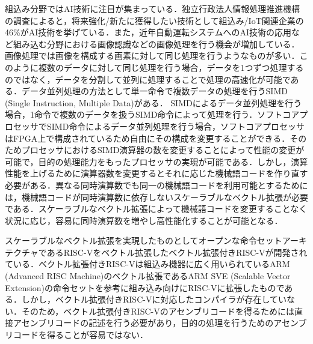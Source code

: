 組込み分野ではAI技術に注目が集まっている．独立行政法人情報処理推進機構の調査によると，将来強化/新たに獲得したい技術として組込み/IoT関連企業の46\%がAI技術を挙げている\cite{bib:ipa}．また，近年自動運転システムへのAI技術の応用など組み込む分野における画像認識などの画像処理を行う機会が増加している．
画像処理では画像を構成する画素に対して同じ処理を行うようなものが多い．このように複数のデータに対して同じ処理を行う場合，データを1つずつ処理するのではなく，データを分割して並列に処理することで処理の高速化が可能である．データ並列処理の方法として単一命令で複数データの処理を行うSIMD (Single Instruction, Multiple Data)がある\cite{bib:simd_mimd}．
SIMDによるデータ並列処理を行う場合，1命令で複数のデータを扱うSIMD命令によって処理を行う．ソフトコアプロセッサでSIMD命令によるデータ並列処理を行う場合，ソフトコアプロセッサはFPGA上で構成されているため自由にその構成を変更することができる．そのためプロセッサにおけるSIMD演算器の数を変更することによって性能の変更が可能で，目的の処理能力をもったプロセッサの実現が可能である．しかし，演算性能を上げるために演算器数を変更するとそれに応じた機械語コードを作り直す必要がある．異なる同時演算数でも同一の機械語コードを利用可能とするためには，機械語コードが同時演算数に依存しないスケーラブルなベクトル拡張が必要である．スケーラブルなベクトル拡張によって機械語コードを変更することなく状況に応じ，容易に同時演算数を増やし高性能化することが可能となる．

スケーラブルなベクトル拡張を実現したものとしてオープンな命令セットアーキテクチャであるRISC-V\cite{bib:risc-v}をベクトル拡張したベクトル拡張付きRISC-Vが開発されている\cite{bib:kimura}．ベクトル拡張付きRISC-Vは組込み機器に広く用いられているARM (Advanced RISC Machine)のベクトル拡張であるARM SVE (Scalable Vector Extension)\cite{bib:arm_sve}の命令セットを参考に組み込み向けにRISC-Vに拡張したものである．しかし，ベクトル拡張付きRISC-Vに対応したコンパイラが存在していない．そのため，ベクトル拡張付きRISC-Vのアセンブリコードを得るためには直接アセンブリコードの記述を行う必要があり，目的の処理を行うためのアセンブリコードを得ることが容易ではない．

